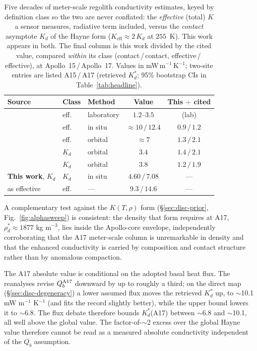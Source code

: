 \documentclass[11pt]{article}
\begin{document}
\begin{table}[!htbp]
\centering\footnotesize
\setlength{\tabcolsep}{5pt}
\caption{Five decades of meter-scale regolith conductivity estimates,
keyed by definition class so the two are never conflated: the
\emph{effective} (total) $K$ a sensor measures, radiative term included,
versus the \emph{contact} asymptote $K_d$ of the Hayne form
($K_\mathrm{eff}\approx 2\,K_d$ at $255$~K). This work appears in both.
The final column is this work divided by the cited value, compared
\emph{within} its class (contact\,/\,contact, effective\,/\,effective),
at Apollo~15\,/\,Apollo~17. Values in mW\,m$^{-1}$\,K$^{-1}$; two-site
entries are listed A15\,/\,A17 (retrieved $K_d^{*}$; 95\% bootstrap CIs
in Table~\ref{tab:headline}).}
\label{tab:priorestimates}
\begin{tabular}{@{}lllcc@{}}
\toprule
Source & Class & Method & Value & This$\,\div\,$cited \\
\midrule
\citet{cremers1971}  & eff.\  & laboratory & $1.2$--$3.5$           & (lab) \\
\citet{langseth1976} & eff.\  & in situ    & ${\approx}10\,/\,12.4$ & $0.9\,/\,1.2$ \\
\citet{vasavada2012} & eff.\  & orbital    & ${\approx}7$           & $1.3\,/\,2.1$ \\
\citet{hayne2017}    & $K_d$  & orbital    & $3.4$                  & $1.4\,/\,2.1$ \\
\citet{feng2020}     & $K_d$  & orbital    & $3.8$                  & $1.2\,/\,1.9$ \\
\midrule
\textbf{This work}, $K_d$ & $K_d$  & in situ & $4.60\,/\,7.08$ & --- \\
\quad as effective        & eff.\  & ---     & $9.3\,/\,14.6$  & --- \\
\bottomrule
\end{tabular}
\end{table}

A complementary test against the \citet{martinez2021}
$K(T,\rho)$ form (\S\ref{sec:disc-prior}, Fig.~\ref{fig:alphasweep})
is consistent: the density that form requires at A17,
$\rho_d^{*}\approx 1877$ kg m$^{-3}$, lies inside the Apollo-core
envelope, independently corroborating that the A17 meter-scale column
is unremarkable in density and that the enhanced conductivity is
carried by composition and contact structure rather than by anomalous
compaction.

The A17 absolute value is conditional on the adopted basal heat flux. The
\citet{saito2007,nagihara2018} reanalyses revise $Q_b^{\rm A17}$ downward
by up to roughly a third; on the direct map
(\S\ref{sec:disc-degeneracy}) a lower assumed flux moves the retrieved
$K_d^{*}$ up, to $\sim$10.1 mW m$^{-1}$ K$^{-1}$ (and fits the
record slightly better), while the upper bound lowers it to $\sim$6.8.
The flux debate therefore bounds $K_d^{*}$(A17) between $\sim$6.8 and
$\sim$10.1, all well above the global value. The
factor-of-$\sim$2 excess over the global Hayne
value therefore cannot be read
as a measured absolute conductivity independent of the $Q_b$ assumption.
\end{document}
